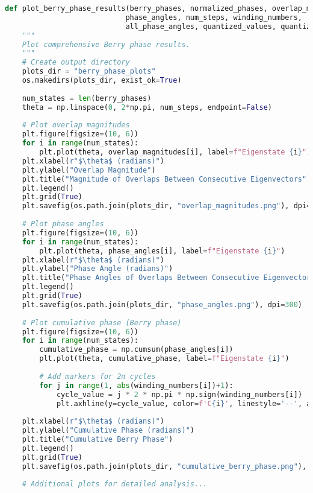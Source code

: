 \documentclass{article}
\begin{document}
\begin{lstlisting}[language=Python, caption=Plotting Berry phase results]
def plot_berry_phase_results(berry_phases, normalized_phases, overlap_magnitudes, 
                            phase_angles, num_steps, winding_numbers, 
                            all_phase_angles, quantized_values, quantization_errors):
    """
    Plot comprehensive Berry phase results.
    """
    # Create output directory
    plots_dir = "berry_phase_plots"
    os.makedirs(plots_dir, exist_ok=True)
    
    num_states = len(berry_phases)
    theta = np.linspace(0, 2*np.pi, num_steps, endpoint=False)
    
    # Plot overlap magnitudes
    plt.figure(figsize=(10, 6))
    for i in range(num_states):
        plt.plot(theta, overlap_magnitudes[i], label=f"Eigenstate {i}")
    plt.xlabel(r"$\theta$ (radians)")
    plt.ylabel("Overlap Magnitude")
    plt.title("Magnitude of Overlaps Between Consecutive Eigenvectors")
    plt.legend()
    plt.grid(True)
    plt.savefig(os.path.join(plots_dir, "overlap_magnitudes.png"), dpi=300)
    
    # Plot phase angles
    plt.figure(figsize=(10, 6))
    for i in range(num_states):
        plt.plot(theta, phase_angles[i], label=f"Eigenstate {i}")
    plt.xlabel(r"$\theta$ (radians)")
    plt.ylabel("Phase Angle (radians)")
    plt.title("Phase Angles of Overlaps Between Consecutive Eigenvectors")
    plt.legend()
    plt.grid(True)
    plt.savefig(os.path.join(plots_dir, "phase_angles.png"), dpi=300)
    
    # Plot cumulative phase (Berry phase)
    plt.figure(figsize=(10, 6))
    for i in range(num_states):
        cumulative_phase = np.cumsum(phase_angles[i])
        plt.plot(theta, cumulative_phase, label=f"Eigenstate {i}")
        
        # Add markers for 2π cycles
        for j in range(1, abs(winding_numbers[i])+1):
            cycle_value = j * 2 * np.pi * np.sign(winding_numbers[i])
            plt.axhline(y=cycle_value, color=f'C{i}', linestyle='--', alpha=0.5)
    
    plt.xlabel(r"$\theta$ (radians)")
    plt.ylabel("Cumulative Phase (radians)")
    plt.title("Cumulative Berry Phase")
    plt.legend()
    plt.grid(True)
    plt.savefig(os.path.join(plots_dir, "cumulative_berry_phase.png"), dpi=300)
    
    # Additional plots for detailed analysis...
\end{lstlisting}
\end{document}
